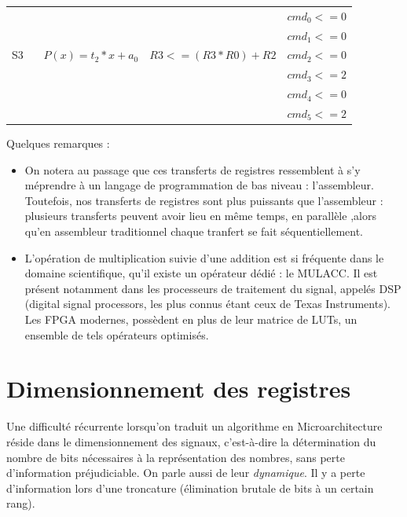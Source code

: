 \documentclass[a4paper,11pt]{exam}
\begin{document}
\begin{questions}
\begin{solution}
\begin{tabular}{|c | c | c | c|}
      \hline
      ~   & ~                   & ~                         & $cmd_0 <= 0$                  \\
      ~   & ~                   & ~                         & $cmd_1 <= 0$                  \\
      S3  & ~ $P(x)=t_2*x+a_0$  & $R3 <= (R3*R0)+R2$        & $cmd_2 <= 0$                  \\
      ~   & ~                   & ~                         & $cmd_3 <= 2$                  \\
      ~   & ~                   & ~                         & $cmd_4 <= 0$                  \\
      ~   & ~                   & ~                         & $cmd_5 <= 2$                  \\
      \hline
    \end{tabular}
    Quelques remarques :
    \begin{itemize}
      \item On notera au passage que ces transferts de registres ressemblent à s'y méprendre à un langage de programmation de bas niveau : l'assembleur. Toutefois, nos transferts de registres sont plus puissants que l'assembleur : plusieurs transferts peuvent avoir lieu en même temps, en parallèle ,alors qu'en assembleur traditionnel chaque tranfert se fait séquentiellement.
      \item L'opération de multiplication suivie d'une addition est si fréquente dans le domaine scientifique, qu'il existe un opérateur dédié : le MULACC. Il est présent notamment dans les processeurs de traitement du signal, appelés DSP (digital signal processors, les plus connus étant ceux de Texas Instruments). Les FPGA modernes, possèdent en plus de leur matrice de LUTs, un ensemble de tels opérateurs optimisés.
    \end{itemize}
  \end{solution}
\end{questions}

\section{Dimensionnement des registres}

Une difficulté récurrente lorsqu'on traduit un algorithme en Microarchitecture réside dans le dimensionnement des signaux, c'est-à-dire la détermination du nombre de bits nécessaires à la représentation des nombres, sans perte d'information préjudiciable. On parle aussi de leur \textit{dynamique}. Il y a perte d'information lors d'une troncature (élimination brutale de bits à un certain rang).
\end{document}
